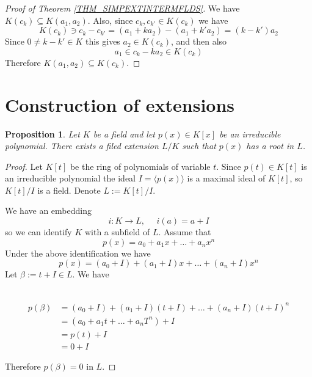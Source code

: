 \documentclass[12pt, letterpaper, oneside]{article}
\theoremstyle{plain}
\newtheorem{proposition}[theorem]{Proposition}
\theoremstyle{definition}
\newcommand{\subgp}[1]{\langle#1\rangle}
\newcommand{\vs}{\vskip 5mm}
\begin{document}
\begin{proof}[Proof of Theorem \ref{THM_SIMPEXTINTERMFLDS}]
We have $K(c_{k})\subseteq K(a_{1}, a_{2})$. Also, since $c_{k}, c_{k'}\in K(c_{k})$
we have 
$$K(c_{k}) \ni c_{k}-c_{k'} = (a_{1}+ka_{2}) - (a_{1}+k'a_{2}) = (k-k')a_{2}$$
Since $0\neq k-k' \in K$ this gives $a_{2}\in K(c_{k})$, and then also 
$$a_{1}\in c_{k}- ka_{2} \in K(c_{k})$$
Therefore $K(a_{1}, a_{2})\subseteq K(c_{k})$. 

\vs



\end{proof}









\newpage
\section{Construction of extensions}
\label{SEC_CONSTREXT}


\begin{proposition}
\label{PROP_ROOTEXT}
Let $K$ be a field and let $p(x)\in K[x]$ be an irreducible polynomial. 
There exists a filed extension $L/K$ such that $p(x)$ has a root in $L$.
\end{proposition}

\vs

\begin{proof}
Let $K[t]$ be the ring of polynomials of variable $t$. Since $p(t)\in K[t]$ is an
irreducible polynomial the ideal $I = \subgp{p(x)}$ is a maximal ideal of $K[t]$, 
so $K[t]/I$ is a field. Denote $L := K[t]/I$. 

We have an embedding 
$$i\colon K \to L, \ \ \ \ \ \ i(a) = a+I$$
so we can identify $K$ with a subfield of $L$.  Assume that 
$$p(x) = a_{0} + a_{1}x + {\dots}  + a_{n}x^{n}$$ 
Under the above identification we have 
$$p(x) = (a_{0}+I) + (a_{1}+I)x + {\dots}  + (a_{n}+I)x^{n}$$ 
Let $\beta := t+I \in L$.  We have 

\vskip -10mm 

\ 
\begin{align*}
p(\beta)  & =  (a_{0}+I) + (a_{1}+I)(t+I) + {\dots}  + (a_{n}+I)(t+I)^{n} \\
 & =  (a_{0} + a_{1}t + {\dots} + a_{n} T^{n}) + I \\
 & = p(t) + I \\
 & = 0 + I
\end{align*}

Therefore $p(\beta) = 0$ in $L$. 

\end{proof}
\end{document}
